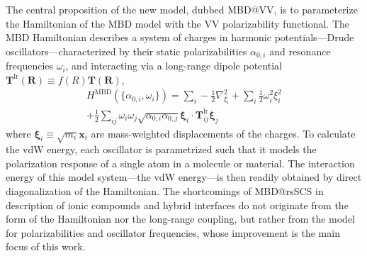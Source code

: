 The central proposition of the new model, dubbed MBD@VV, is to parameterize the Hamiltonian of the MBD model with the VV polarizability functional.
The MBD Hamiltonian describes a system of charges in harmonic potentials---Drude oscillators---characterized by their static polarizabilities $\alpha_{0,i}$ and resonance frequencies $\omega_i$, and interacting via a long-range dipole potential $\mathbf T^\mathrm{lr}(\mathbf R)\equiv f(R)\mathbf T(\mathbf R)$,
\begin{multline}
  H^\text{MBD}(\{\alpha_{0,i},\omega_i\})=\sum_i-\frac12\nabla_{\xi_i}^2+\sum_i\frac12\omega_i^2\xi_i^2 \\
  +\frac12\sum_{ij}\omega_i\omega_j\sqrt{\alpha_{0,i}\alpha_{0,j}}\boldsymbol{\xi}_i\cdot\mathbf T^\mathrm{lr}_{ij}\boldsymbol{\xi}_j
\end{multline}
where $\boldsymbol\xi_i\equiv\sqrt{m_i}\mathbf x_i$ are mass-weighted displacements of the charges.
To calculate the vdW energy, each oscillator is parametrized such that it models the polarization response of a single atom in a molecule or material.
The interaction energy of this model system---the vdW energy---is then readily obtained by direct diagonalization of the Hamiltonian.
The shortcomings of MBD@rsSCS in description of ionic compounds and hybrid interfaces do not originate from the form of the Hamiltonian nor the long-range coupling, but rather from the model for polarizabilities and oscillator frequencies, whose improvement is the main focus of this work.

